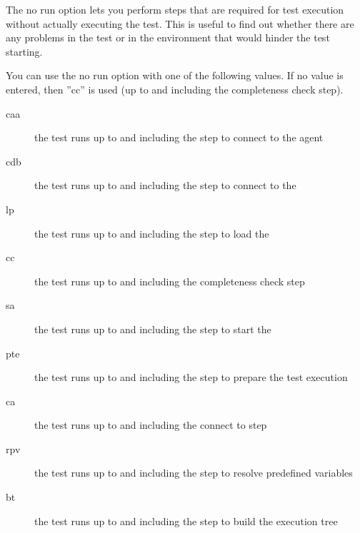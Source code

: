 The no run option lets you perform steps that are required for test execution without actually executing the test. This is useful to find out whether there are any problems in the test or in the environment that would hinder the test starting.

You can use the no run option with one of the following values. If no value is entered, then ''cc'' is used (up to and including the completeness check step).

\begin{description}
\item [caa]{the test runs up to and including the step to connect to the \gdaut{} agent}
\item [cdb]{the test runs up to and including the step to connect to the \gddb{}}
\item [lp]{the test runs up to and including the step to load the \gdproject{}}
\item [cc]{the test runs up to and including the completeness check step}
\item [sa]{the test runs up to and including the step to start the \gdaut{}}
\item [pte]{the test runs up to and including the step to prepare the test execution}
\item [ca]{the test runs up to and including the connect to \gdaut{} step}
\item [rpv]{the test runs up to and including the step to resolve predefined variables}
\item [bt]{the test runs up to and including the step to build the execution tree}
\end{description}
